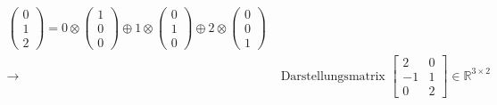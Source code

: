 \documentclass[a5paper, 10pt]{book}
\newcommand{\circleplus}{\oplus}%
\newcommand{\circlecdot}{\otimes}%
\begin{document}
\begin{itemize}
\begin{align}
\begin{pmatrix}
							0 \\ 1 \\ 2
							\end{pmatrix} = 0 \circlecdot \begin{pmatrix}
							1 \\ 0 \\ 0
							\end{pmatrix} \circleplus 1 \circlecdot \begin{pmatrix}
							0 \\ 1 \\ 0
							\end{pmatrix} \circleplus 2 \circlecdot \begin{pmatrix}
							0 \\ 0 \\ 1
							\end{pmatrix}\\
							\rightarrow& \text{ Darstellungsmatrix }\begin{bmatrix}
							2	& 0 \\
							-1	& 1 \\
							0	& 2
							\end{bmatrix} \in \mathbb{R}^{3 \times 2}
						\end{align}
						

\end{itemize}
\end{document}
